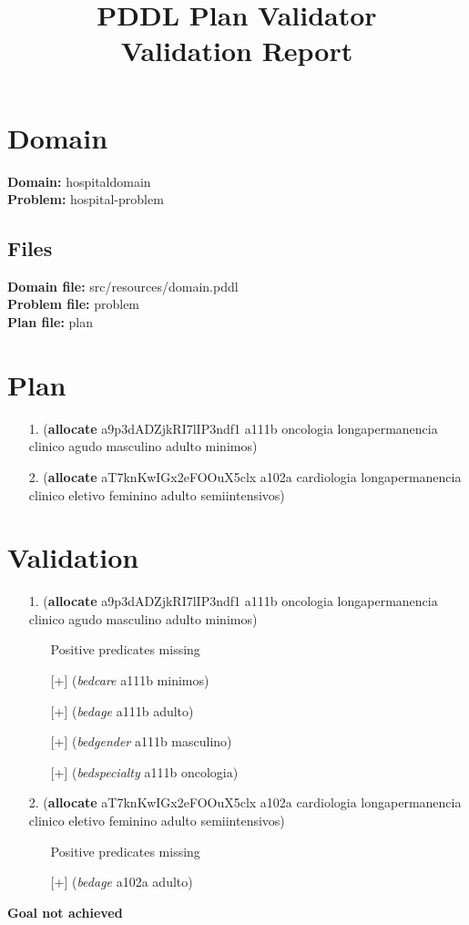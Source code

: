 \documentclass{article}
\title{\textbf{PDDL Plan Validator}\\Validation Report}
\date{} %
\begin{document}
\maketitle

\section{Domain}
\textbf{Domain:}  hospitaldomain\\
\textbf{Problem:} hospital-problem

\subsection{Files}
\textbf{Domain file:}  src/resources/domain.pddl \\
\textbf{Problem file:} problem\\
\textbf{Plan file:}    plan

\section{Plan}

\begin{itemize}
    \item[1.] (\textbf{allocate} a9p3dADZjkRI7lIP3ndf1 a111b oncologia longapermanencia clinico agudo masculino adulto minimos)
    \item[2.] (\textbf{allocate} aT7knKwIGx2eFOOuX5clx a102a cardiologia longapermanencia clinico eletivo feminino adulto semiintensivos)
\end{itemize}

\section{Validation}

\begin{itemize}
\item[1.] (\textbf{allocate} a9p3dADZjkRI7lIP3ndf1 a111b oncologia longapermanencia clinico agudo masculino adulto minimos)
\begin{itemize}
	\item[\textbullet] Positive predicates missing
	\item[\textbullet] [+] (\textit{bedcare} a111b minimos)
	\item[\textbullet] [+] (\textit{bedage} a111b adulto)
	\item[\textbullet] [+] (\textit{bedgender} a111b masculino)
	\item[\textbullet] [+] (\textit{bedspecialty} a111b oncologia)
\end{itemize}
\item[2.] (\textbf{allocate} aT7knKwIGx2eFOOuX5clx a102a cardiologia longapermanencia clinico eletivo feminino adulto semiintensivos)
\begin{itemize}
	\item[\textbullet] Positive predicates missing
	\item[\textbullet] [+] (\textit{bedage} a102a adulto)
\end{itemize}
\end{itemize}

\hline
\vspace{10pt}
\large \textbf{Goal not achieved}
\end{document}
